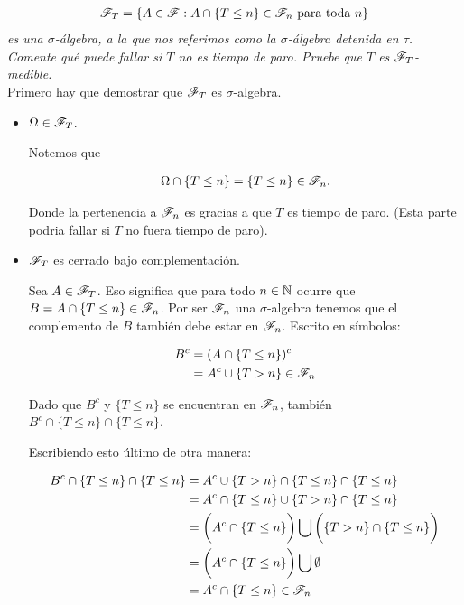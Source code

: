 \emph{
	\begin{align}
		\mathscr{F}_T=\left\{ A\in\mathscr{F}:A\cap\left\{ T\leq n\right\} \in\mathscr{F}_n\text{ para toda } n\right\} 
	\end{align}
	es una $\sigma$-\'algebra, 
	a la que nos referimos como la $\sigma$-\'algebra detenida en $\tau$. Comente qu\'e puede fallar si $T$ no es tiempo de paro. 
	Pruebe que $T$ es $\mathscr{F}_T$-medible.\\		
}			
\afterstatement		
	Primero hay que demostrar que $\mathscr{F}_T$ es $\sigma$-algebra.\par\null
	
	\begin{itemize}
		\item $\Omega \in \mathscr{F}_T$.\par\null
		
			Notemos que 
            
			\begin{align}
				\Omega \cap \{T \leq n\} = \{T \leq n\} \in \mathscr{F}_n.
			\end{align}\par\null
            
			Donde la pertenencia a $\mathscr{F}_n$ es gracias a que $T$ es tiempo de paro. (Esta parte podria fallar si 
			$T$ no fuera tiempo de paro).\par\null
		
		\item $\mathscr{F}_T$ es cerrado bajo complementación.\par\null
		
			Sea $A \in \mathscr{F}_T$. Eso significa que para todo $n \in  \mathbb{N}$ ocurre que $B = A \cap \{ T \leq n \} \in \mathscr{F}_n$. 
			Por ser $\mathscr{F}_n$ una $\sigma$-algebra tenemos que el complemento de $B$ también debe estar en $\mathscr{F}_n$. 
			Escrito en símbolos:
			
			\begin{align}
				B^c 	&= (A   \cap \{ T \leq n \})^c      \\
						&=  A^c \cup \{ T > n \} \in \mathscr{F}_n
			\end{align}
			
			Dado que $B^c$ y $\{ T \leq n \}$ se encuentran en $\mathscr{F}_n$, también \\
			$B^c \cap \{ T \leq n \} \cap \{ T \leq n \}$.\par\null
			
			Escribiendo esto último de otra manera:
            
			\begin{align}
				B^c \cap \{ T \leq n \} \cap \{ T \leq n \} 	&=		A^c \cup \{ T > n \} \cap \{ T \leq n \} \cap \{ T \leq n \} \\
																&= 		A^c \cap \{ T \leq n \} \cup \{ T > n \} \cap \{ T \leq n \} \\
																&= 		\bigg(A^c \cap \{ T \leq n \}\bigg) 
																			\bigcup 
																		\bigg(\{ T > n \} \cap \{ T \leq n \}\bigg) \\
																&=		\bigg(A^c \cap \{ T \leq n \}\bigg)	\bigcup \emptyset \\
																&=		A^c \cap \{ T \leq n \} \in \mathscr{F}_n
			\end{align}
			

\end{itemize}
